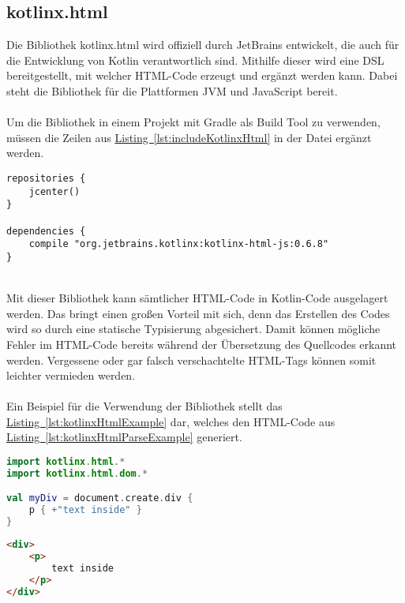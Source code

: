 \subsection{kotlinx.html}\label{sec:kotlinxHtml}
Die Bibliothek kotlinx.html \cite{kotlinxHtml} wird offiziell durch JetBrains entwickelt, die auch für die Entwicklung von Kotlin verantwortlich sind. Mithilfe dieser wird eine \gls{DSL} bereitgestellt, mit welcher \gls{HTML}-Code erzeugt und ergänzt werden kann. Dabei steht die Bibliothek für die Plattformen \gls{JVM} und JavaScript bereit.\\
\\
Um die Bibliothek in einem Projekt mit Gradle als Build Tool zu verwenden, müssen die Zeilen aus \hyperref[lst:includeKotlinxHtml]{Listing~\ref{lst:includeKotlinxHtml}} in der Datei  ergänzt werden.
\\
\begin{lstlisting}[style=lstStyleFramed, language=Gradle, caption={Einbindung der Bibliothek kotlinx.html mittels Gradle}, label=lst:includeKotlinxHtml, float]
repositories {
	jcenter()
}

dependencies {
	compile "org.jetbrains.kotlinx:kotlinx-html-js:0.6.8"
}
\end{lstlisting}
\\
Mit dieser Bibliothek kann sämtlicher \gls{HTML}-Code in Kotlin-Code ausgelagert werden. Das bringt einen großen Vorteil mit sich, denn das Erstellen des Codes wird so durch eine statische Typisierung abgesichert. Damit können mögliche Fehler im \gls{HTML}-Code bereits während der Übersetzung des Quellcodes erkannt werden. Vergessene oder gar falsch verschachtelte \gls{HTML}-Tags können somit leichter vermieden werden.\\
\\
Ein Beispiel für die Verwendung der Bibliothek stellt das \hyperref[lst:kotlinxHtmlExample]{Listing~\ref{lst:kotlinxHtmlExample}} dar, welches den \gls{HTML}-Code aus \hyperref[lst:kotlinxHtmlParseExample]{Listing~\ref{lst:kotlinxHtmlParseExample}} generiert.
\\
\begin{lstlisting}[style=lstStyleFramed, language=Kotlin, caption={Beispiel: Verwendung der Bibliothek kotlinx.html \cite{kotlinxHtmlExample}}, label=lst:kotlinxHtmlExample, float]
import kotlinx.html.*
import kotlinx.html.dom.*

val myDiv = document.create.div {
	p { +"text inside" }
}
\end{lstlisting}
\begin{lstlisting}[style=lstStyleFramed, language=html, caption={Beispiel: Verwendung der Bibliothek kotlinx.html (Ergebnis)}, label=lst:kotlinxHtmlParseExample, float]
<div>
	<p>
		text inside
	</p>
</div>
\end{lstlisting}

